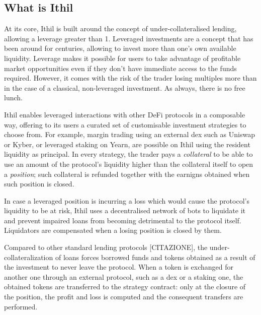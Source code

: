 \documentclass[a4paper,10 pt]{article}
\theoremstyle{definition}
\begin{document}
\subsection{What is Ithil}

At its core, Ithil is built around the concept of under-collateralised lending, allowing a leverage greater than 1.
Leveraged investments are a concept that has been around for centuries, allowing to invest more than one's own available liquidity. Leverage makes it possible for users to take advantage of profitable market opportunities even if they don't have immediate access to the funds required. However, it comes with the risk of the trader losing multiples more than in the case of a classical, non-leveraged investment. As always, there is no free lunch.

Ithil enables leveraged interactions with other DeFi protocols in a composable way, offering to its users a curated set of customisable investment strategies to choose from. For example, margin trading using an external dex such as Uniswap or Kyber, or leveraged staking on Yearn, are possible on Ithil using the resident liquidity as principal. In every strategy, the trader pays a {\it collateral} to be able to use an amount of the protocol's liquidity higher than the collateral itself to open a {\it position}; such collateral is refunded together with the earnigns obtained when such position is closed.

In case a leveraged position is incurring a loss which would cause the protocol's liquidity to be at risk, Ithil uses a decentralised network of bots to liquidate it and prevent impaired loans from becoming detrimental to the protocol itself. Liquidators are compensated when a losing position is closed by them.

Compared to other standard lending protocols [CITAZIONE], the under-collateralization of loans forces borrowed funds and tokens obtained as a result of the investment to never leave the protocol. When a token is exchanged for another one through an external protocol, such as a dex or a staking one, the obtained tokens are transferred to the strategy contract: only at the closure of the position, the profit and loss is computed and the consequent transfers are performed.
\end{document}
